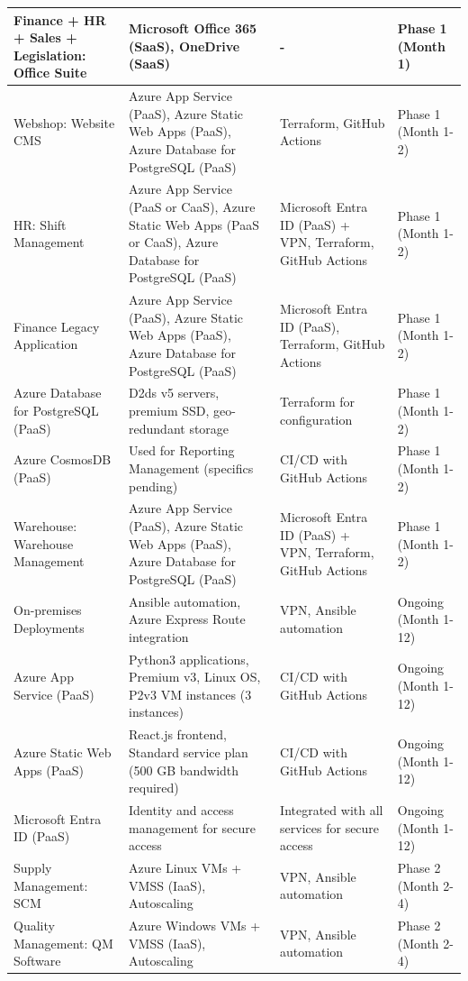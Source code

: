 \documentclass{llncs}
\begin{document}
\begin{longtable}{|p{3.1cm}|p{5.2cm}|p{3.1cm}|l|}
    Finance + HR + Sales + Legislation: Office Suite & Microsoft Office 365 (SaaS), OneDrive (SaaS) & - & Phase 1 (Month 1) \\
    \hline
    Webshop: Website CMS & Azure App Service (PaaS), Azure Static Web Apps (PaaS), Azure Database for PostgreSQL (PaaS) & Terraform, GitHub Actions & Phase 1 (Month 1-2) \\
    \hline
    HR: Shift Management & Azure App Service (PaaS or CaaS), Azure Static Web Apps (PaaS or CaaS), Azure Database for PostgreSQL (PaaS) & Microsoft Entra ID (PaaS) + VPN, Terraform, GitHub Actions & Phase 1 (Month 1-2) \\
    \hline
    Finance Legacy Application & Azure App Service (PaaS), Azure Static Web Apps (PaaS), Azure Database for PostgreSQL (PaaS) & Microsoft Entra ID (PaaS), Terraform, GitHub Actions & Phase 1 (Month 1-2) \\
    \hline
    Azure Database for PostgreSQL (PaaS) & D2ds v5 servers, premium SSD, geo-redundant storage & Terraform for configuration & Phase 1 (Month 1-2) \\
    \hline
    Azure CosmosDB (PaaS) & Used for Reporting Management (specifics pending) & CI/CD with GitHub Actions & Phase 1 (Month 1-2) \\
    \hline
    Warehouse: Warehouse Management & Azure App Service (PaaS), Azure Static Web Apps (PaaS), Azure Database for PostgreSQL (PaaS) & Microsoft Entra ID (PaaS) + VPN, Terraform, GitHub Actions & Phase 1 (Month 1-2) \\
    \hline
    On-premises Deployments & Ansible automation, Azure Express Route integration & VPN, Ansible automation & Ongoing (Month 1-12) \\
    \hline
    Azure App Service (PaaS) & Python3 applications, Premium v3, Linux OS, P2v3 VM instances (3 instances) & CI/CD with GitHub Actions & Ongoing (Month 1-12) \\
    \hline
    Azure Static Web Apps (PaaS) & React.js frontend, Standard service plan (500 GB bandwidth required) & CI/CD with GitHub Actions & Ongoing (Month 1-12) \\
    \hline
    Microsoft Entra ID (PaaS) & Identity and access management for secure access & Integrated with all services for secure access & Ongoing (Month 1-12) \\
    \hline
    Supply Management: SCM & Azure Linux VMs + VMSS (IaaS), Autoscaling & VPN, Ansible automation & Phase 2 (Month 2-4) \\
    \hline
    Quality Management: QM Software & Azure Windows VMs + VMSS (IaaS), Autoscaling & VPN, Ansible automation & Phase 2 (Month 2-4) \\

\end{longtable}
\end{document}
